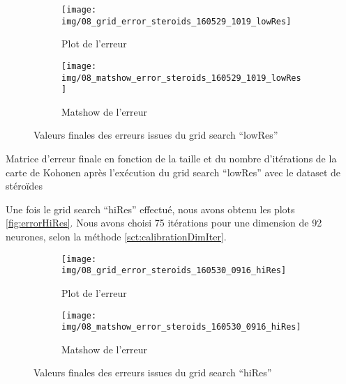    \begin{figure}[H]
        \begin{subfigure}[b]{0.45\textwidth}
            \centering
            \texttt{[image: img/08\_grid\_error\_steroids\_160529\_1019\_lowRes]}    
            \caption{Plot de l'erreur}
            \label{fig:errorPlotLowRes}
        \end{subfigure}
        \begin{subfigure}[b]{0.45\textwidth}
            \centering
            \texttt{[image: img/08\_matshow\_error\_steroids\_160529\_1019\_lowRes]}    
            \caption{Matshow de l'erreur}
            \label{fig:errorMatshowLowRes}
        \end{subfigure}
        \caption{Valeurs finales des erreurs issues du grid search ``lowRes''}
        \label{fig:errorLowRes}
    \end{figure}

    \begin{table}[H]
        \centering
        
        \caption{Matrice d'erreur finale en fonction de la taille et du nombre d'itérations de la carte de Kohonen après l'exécution du grid search ``lowRes'' avec le dataset de stéroïdes}
        \label{tab:errorMatrixLowRes}
    \end{table}

    Une fois le grid search ``hiRes'' effectué, nous avons obtenu les plots \autoref{fig:errorHiRes}. Nous avons choisi 75 itérations pour une dimension de 92 neurones, selon la méthode \autoref{sct:calibrationDimIter}.

    \begin{figure}[H]
        \begin{subfigure}[b]{0.5\textwidth}
            \centering
            \texttt{[image: img/08\_grid\_error\_steroids\_160530\_0916\_hiRes]}
            \caption{Plot de l'erreur}
            \label{fig:errorPlotHiRes}
        \end{subfigure}
        \begin{subfigure}[b]{0.5\textwidth}
            \centering
            \texttt{[image: img/08\_matshow\_error\_steroids\_160530\_0916\_hiRes]}    
            \caption{Matshow de l'erreur}
            \label{fig:errorMatshowHiRes}
        \end{subfigure}
        \caption{Valeurs finales des erreurs issues du grid search ``hiRes''}
        \label{fig:errorHiRes}
    \end{figure}


